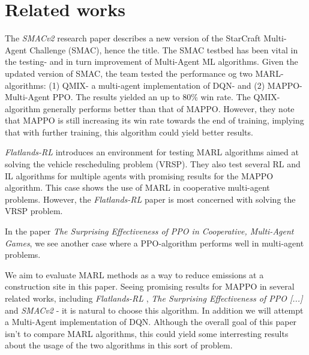 \documentclass[conference]{IEEEtran}
\begin{document}


	\section{Related works}
	The \textit{SMACv2} \cite{ellis2022smacv2} research paper describes a new version of the StarCraft Multi-Agent
  Challenge (SMAC), hence the title. The SMAC testbed has been vital in the testing- and in turn improvement
  of Multi-Agent ML algorithms. Given the updated version of SMAC, the team tested the performance og two
  MARL- algorithms: (1) QMIX- a multi-agent implementation of DQN- and (2) MAPPO- Multi-Agent PPO. The
  results yielded an up to 80\% win rate. The QMIX-algorithm generally performs better than that of MAPPO.
  However, they note that MAPPO is still increasing its win rate towards the end of training, implying
  that with further training, this algorithm could yield better results.

  \textit{Flatlands-RL} \cite{laurent2021flatland} introduces an environment for testing MARL algorithms aimed at
  solving the vehicle rescheduling problem (VRSP). They also test several RL and IL algorithms for
  multiple agents with promising results for the MAPPO algorithm. This case shows the use of MARL in cooperative
  multi-agent problems. However, the \textit{Flatlands-RL} paper is most concerned with solving the VRSP problem.

  In the paper \textit{The Surprising Effectiveness of PPO in Cooperative, Multi-Agent Games}, \cite{yu2022surprising}
  we see another case where a PPO-algorithm performs well in multi-agent problems.

  We aim to evaluate MARL methods as a way to reduce \coo emissions at a construction site in this paper.
  Seeing promising results for MAPPO in several related works, including \textit{Flatlands-RL} \cite{laurent2021flatland},
  \textit{The Surprising Effectiveness of PPO [...]} \cite{yu2022surprising} and \textit{SMACv2} \cite{ellis2022smacv2}-
  it is natural to choose this algorithm. In addition we will attempt a Multi-Agent implementation of DQN. Although the
  overall goal of this paper isn't to compare MARL algorithms, this could yield some interresting results about the
  usage of the two algorithms in this sort of problem.

\end{document}
